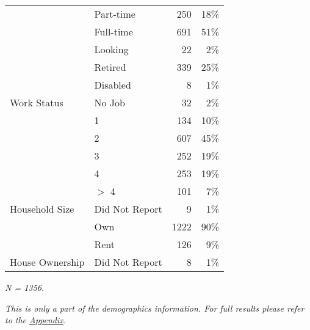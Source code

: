 \begin{table}[H]
\begin{threeparttable}
\begin{tabular}[t]{llrr}
 & Part-time & 250 & 18\%\\

 & Full-time & 691 & 51\%\\

 & Looking & 22 & 2\%\\

 & Retired & 339 & 25\%\\

 & Disabled & 8 & 1\%\\

\multirow{-7}{*}{\raggedright\arraybackslash Work Status} & No Job & 32 & 2\%\\
\cmidrule(lr){1-4}
 & 1 & 134 & 10\%\\

 & 2 & 607 & 45\%\\

 & 3 & 252 & 19\%\\

 & 4 & 253 & 19\%\\

 & $>$ 4 & 101 & 7\%\\

\multirow{-6}{*}{\raggedright\arraybackslash Household Size} & Did Not Report & 9 & 1\%\\
\cmidrule(lr){1-4}
 & Own & 1222 & 90\%\\

 & Rent & 126 & 9\%\\

\multirow{-3}{*}{\raggedright\arraybackslash House Ownership} & Did Not Report & 8 & 1\%\\
\bottomrule
\end{tabular}
\begin{tablenotes}
\small
\item [1] \textit{N = 1356.}
\item [2] \textit{This is only a part of the demographics information. For full results please refer to the \hyperref[appendix]{Appendix}.}
\end{tablenotes}
\label{table_demographics}
\end{threeparttable}
\end{table}